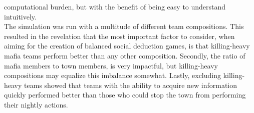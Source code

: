 computational burden, but with the benefit of being easy to understand
intuitively. \\
The simulation was run with a multitude of different team compositions. This
resulted in the revelation that the most important factor to consider, when
aiming for the creation of balanced social deduction games, is that killing-heavy mafia teams perform better than any other composition. Secondly, the ratio of mafia members to town members, is very impactful, but killing-heavy compositions may equalize this imbalance somewhat. Lastly, excluding killing-heavy teams showed that teams with the ability to acquire new information quickly performed better than those who could stop the town from performing their nightly actions.\\
\twocolumn